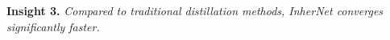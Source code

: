 \documentclass{article} %
\begin{document}



\textbf{Insight 3.} \textit{Compared to traditional distillation methods, InherNet converges significantly faster.}


\end{document}
